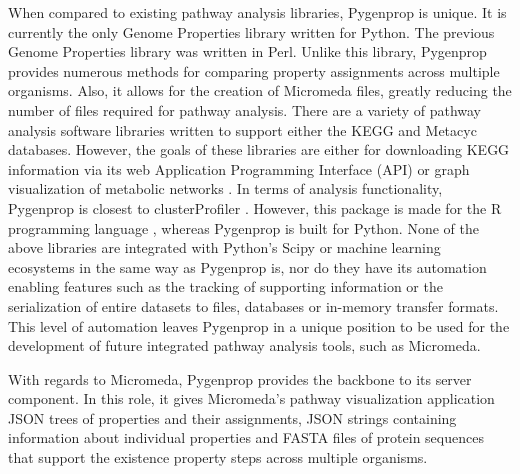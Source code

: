 When compared to existing pathway analysis libraries, Pygenprop is unique. It is currently the only Genome Properties library written for Python. The previous Genome Properties library was written in Perl. Unlike this library, Pygenprop provides numerous methods for comparing property assignments across multiple organisms. Also, it allows for the creation of Micromeda files, greatly reducing the number of files required for pathway analysis. There are a variety of pathway analysis software libraries written to support either the KEGG \cite{zhang2009kegggraph,posma2013metabonetworks,yu2012clusterprofiler,cock2009biopython} and Metacyc \cite{international} databases. However, the goals of these libraries are either for downloading KEGG information via its web Application Programming Interface (API) \cite{cock2009biopython} or graph visualization of metabolic networks \cite{posma2013metabonetworks}. In terms of analysis functionality, Pygenprop is closest to clusterProfiler \cite{yu2012clusterprofiler}. However, this package is made for the R programming language \cite{rprogman}, whereas Pygenprop is built for Python. None of the above libraries are integrated with Python's Scipy \cite{scipystack} or machine learning ecosystems in the same way as Pygenprop is, nor do they have its automation enabling features such as the tracking of supporting information or the serialization of entire datasets to files, databases or in-memory transfer formats. This level of automation leaves Pygenprop in a unique position to be used for the development of future integrated pathway analysis tools, such as Micromeda.

With regards to Micromeda, Pygenprop provides the backbone to its server component. In this role, it gives Micromeda's pathway visualization application JSON trees of properties and their assignments, JSON strings containing information about individual properties and FASTA files of protein sequences that support the existence property steps across multiple organisms.
